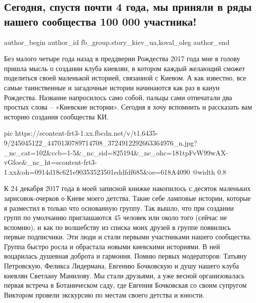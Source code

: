  
 
 
 
 
 
\subsection{Сегодня, спустя почти 4 года, мы приняли в ряды нашего сообщества 100 000 участника!}
\label{sec:10_10_2021.fb.fb_group.story_kiev_ua.1.gruppa}
 
\ifcmt
 author_begin
   author_id fb_group.story_kiev_ua,koval_oleg
 author_end
\fi

Без малого четыре года назад в преддверии Рождества 2017 года мне в голову
пришла мысль о создании клуба киевлян, в котором каждый желающий сможет
поделиться своей маленькой историей, связанной с Киевом. А как известно, все
самые таинственные и загадочные истории начинаются как раз в канун Рождества.
Название напросилось само собой, пальцы сами отпечатали два простых слова –
«Киевские истории». Сегодня я хочу вспомнить и рассказать вам историю создания
сообщества КИ. 

\ifcmt
  pic https://scontent-frt3-1.xx.fbcdn.net/v/t1.6435-9/245045122_4470130789714708_3724912292663364976_n.jpg?_nc_cat=102&ccb=1-5&_nc_sid=825194&_nc_ohc=181tpFvW99wAX-vGfoe&_nc_ht=scontent-frt3-1.xx&oh=0914d18c621e90353523501eddfdf685&oe=618A4090
  @width 0.8
\fi

К 24 декабря 2017 года в моей записной книжке накопилось с десяток маленьких
зарисовок-очерков о Киеве моего детства. Такие себе ламповые истории, которые я
разместил в только что основанную группу. Так вышло, что при создании групп по
умолчанию приглашаются 45 человек или около того (сейчас не вспомню), и как по
волшебству из списка моих друзей в группе появились первые подписчики. Эти люди
и стали первыми участниками нашего сообщества. Группа быстро росла и обрастала
новыми киевскими историями. В ней воцарилась душевная доброта и гармония. Помню
первых модераторов: Татьяну Петровскую, Феликса Лидермана, Евгению Бочковскую и
душу нашего клуба киевлян Светлану Манилову. Мы стали друзьями, а уже весной
организовалась первая встреча в Ботаническом саду, где Евгения Бочковская со
своим супругом Виктором провели экскурсию по местам своего детства и юности. 

